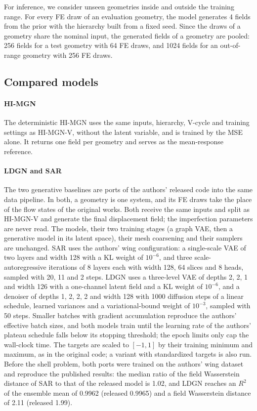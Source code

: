 \documentclass[preprint,12pt]{elsarticle}
\begin{document}
For inference, we consider unseen geometries inside and outside the training range. For every FE
draw of an evaluation geometry, the model generates 4 fields from the prior with the hierarchy
built from a fixed seed. Since the draws of a geometry share the nominal input, the generated
fields of a geometry are pooled: 256 fields for a test geometry with 64 FE draws, and 1024 fields
for an out-of-range geometry with 256 FE draws.

\subsection{Compared models}\label{sec:baselines}

\paragraph{HI-MGN} The deterministic HI-MGN uses the same inputs, hierarchy, V-cycle and training
settings as HI-MGN-V, without the latent variable, and is trained by the MSE alone. It returns one
field per geometry and serves as the mean-response reference.

\paragraph{LDGN and SAR} The two generative baselines are ports of the authors' released code
\cite{lino2025distributions,lino2026sar} into the same data pipeline. In both, a geometry is one
system, and its FE draws take the place of the flow states of the original works. Both receive
the same inputs and split as HI-MGN-V and generate the final displacement field; the imperfection
parameters are never read. The models, their two training stages (a graph VAE, then a generative
model in its latent space), their mesh coarsening and their samplers are unchanged. SAR uses the
authors' wing configuration: a single-scale VAE of two layers and width 128 with a KL weight of
$10^{-6}$, and three scale-autoregressive iterations of 8 layers each with width 128, 64 slices
and 8 heads, sampled with 20, 11 and 2 steps. LDGN uses a three-level VAE of depths 2, 2, 1 and
width 126 with a one-channel latent field and a KL weight of $10^{-6}$, and a denoiser of depths 1,
2, 2, 2 and width 128 with 1000 diffusion steps of a linear schedule, learned variances and a
variational-bound weight of $10^{-3}$, sampled with 50 steps. Smaller batches with gradient
accumulation reproduce the authors' effective batch sizes, and both models train until the
learning rate of the authors' plateau schedule falls below its stopping threshold; the epoch
limits only cap the wall-clock time. The targets are scaled to $[-1,1]$ by their training minimum
and maximum, as in the original code; a variant with standardized targets is also run. Before
the shell problem, both ports were trained on the authors' wing dataset and reproduce the
published results: the median ratio of the field Wasserstein distance of SAR to that of the
released model is 1.02, and LDGN reaches an $R^2$ of the ensemble mean of 0.9962 (released 0.9965)
and a field Wasserstein distance of 2.11 (released 1.99).
\end{document}
